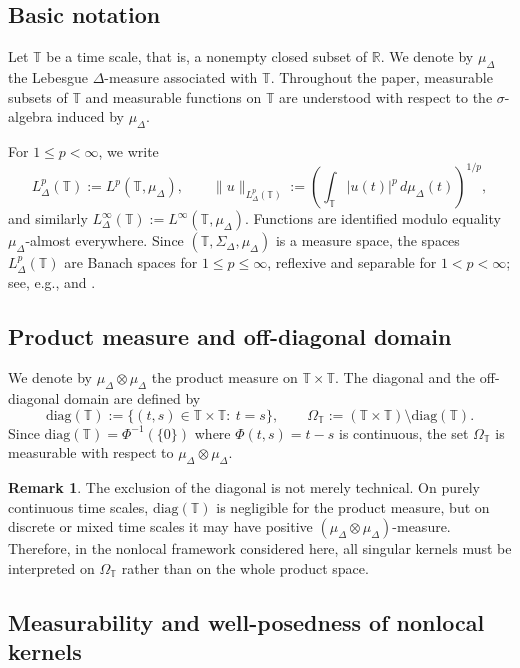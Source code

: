 \documentclass[11pt,a4paper]{article}
\numberwithin{equation}{section}
\theoremstyle{definition}
\newtheorem{remark}[remark]{Remark}
\newcommand{\R}{\mathbb{R}}
\newcommand{\T}{\mathbb{T}}
\newcommand{\diag}{\mathrm{diag}}
\begin{document}
\subsection{Basic notation}

Let $\T$ be a time scale, that is, a nonempty closed subset of $\R$. We denote by $\mu_\Delta$ the Lebesgue $\Delta$-measure associated with $\T$. Throughout the paper, measurable subsets of $\T$ and measurable functions on $\T$ are understood with respect to the $\sigma$-algebra induced by $\mu_\Delta$.

For $1\le p<\infty$, we write
\[
L^p_{\Delta}(\T):=L^p(\T,\mu_\Delta),
\qquad
\|u\|_{L^p_{\Delta}(\T)}
:=
\left(
\int_{\T}|u(t)|^p\,d\mu_\Delta(t)
\right)^{1/p},
\]
and similarly $L^\infty_{\Delta}(\T):=L^\infty(\T,\mu_\Delta)$. Functions are identified modulo equality $\mu_\Delta$-almost everywhere. Since $(\T,\Sigma_\Delta,\mu_\Delta)$ is a measure space, the spaces $L^p_{\Delta}(\T)$ are Banach spaces for $1\le p\le\infty$, reflexive and separable for $1<p<\infty$; see, e.g., \cite[Chapter~6]{Folland1999} and \cite[Chapter~III]{Conway1990}.

\subsection{Product measure and off-diagonal domain}

We denote by $\mu_\Delta\otimes\mu_\Delta$ the product measure on $\T\times\T$. The diagonal and the off-diagonal domain are defined by
\[
\diag(\T):=\{(t,s)\in\T\times\T:\ t=s\},
\qquad
\Omega_{\T}:=(\T\times\T)\setminus\diag(\T).
\]
Since $\diag(\T)=\Phi^{-1}(\{0\})$ where $\Phi(t,s)=t-s$ is continuous, the set $\Omega_{\T}$ is measurable with respect to $\mu_\Delta\otimes\mu_\Delta$.

\begin{remark}\label{rem:diagonal-positive-measure}
The exclusion of the diagonal is not merely technical. On purely continuous time scales, $\diag(\T)$ is negligible for the product measure, but on discrete or mixed time scales it may have positive $(\mu_\Delta\otimes\mu_\Delta)$-measure. Therefore, in the nonlocal framework considered here, all singular kernels must be interpreted on $\Omega_{\T}$ rather than on the whole product space.
\end{remark}

\subsection{Measurability and well-posedness of nonlocal kernels}
\end{document}

